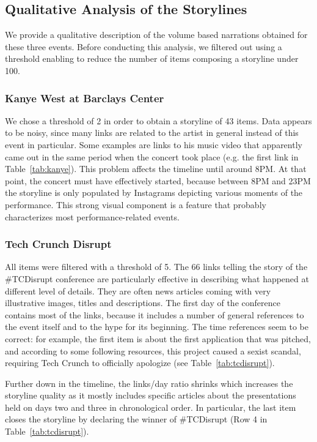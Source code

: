 \documentclass{sig-alternate-somus}
\begin{document}
\subsection{Qualitative Analysis of the Storylines}
\label{sec:storylines}
We provide a qualitative description of the volume based narrations obtained for these three events. Before conducting this analysis, we filtered out using a threshold enabling to reduce the number of items composing a storyline under 100.

\subsubsection{Kanye West at Barclays Center}
We chose a threshold of 2 in order to obtain a storyline of 43 items. Data appears to be noisy, since many links are related to the artist in general instead of this event in particular. Some examples are links to his music video that apparently came out in the same period when the concert took place (e.g. the first link in Table~\ref{tab:kanye}). This problem affects the timeline until around 8PM. At that point, the concert must have effectively started, because between 8PM and 23PM the storyline is only populated by Instagrams depicting various moments of the performance. This strong visual component is a feature that probably characterizes most performance-related events.

\subsubsection{Tech Crunch Disrupt}
All items were filtered with a threshold of 5. The 66 links telling the story of the \#TCDisrupt conference are particularly effective in describing what happened at different level of details. They are often news articles coming with very illustrative images, titles and descriptions. The first day of the conference contains most of the links, because it includes a number of general references to the event itself and to the hype for its beginning. The time references seem to be correct: for example, the first item is about the first application that was pitched, and according to some following resources, this project caused a sexist scandal, requiring Tech Crunch to officially apologize (see Table~\ref{tab:tcdisrupt}).

Further down in the timeline, the links/day ratio shrinks which increases the storyline quality as it mostly includes specific articles about the presentations held on days two and three in chronological order. In particular, the last item closes the storyline by declaring the winner of \#TCDisrupt (Row 4 in Table~\ref{tab:tcdisrupt}).
\end{document}
